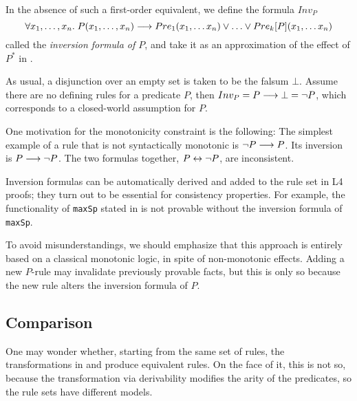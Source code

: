 In the absence of such a first-order equivalent, we define the formula $Inv_P$
\[
\forall x_1, \dots, x_n.\;  P(x_1, \dots, x_n) \IMPL Pre_1(x_1, \dots x_n) \OR \dots \OR Pre_k[P](x_1, \dots x_n)
\]
called the \emph{inversion formula of  $P$}, and take it as an approximation of the
effect of $P^*$ in .

As usual, a disjunction over an empty set is taken to be the falsum
$\bot$. Assume there are no defining rules for a predicate $P$, then $Inv_P =
P \longrightarrow \bot = \lnot P$, which corresponds to a closed-world assumption for $P$.

\begin{example}\label{ex:syntactically_non_monotonic_rule}
  One motivation for the monotonicity constraint is the following: The
  simplest example of a rule that is not syntactically monotonic is
  $\lnot P \longrightarrow P$. Its inversion is $P \longrightarrow \lnot P$. The two formulas
  together, $P \leftrightarrow \lnot P$, are inconsistent.
\end{example}

Inversion formulas can be automatically derived and added to the rule set in
L4 proofs; they turn out to be essential for consistency properties. For
example, the functionality of \texttt{maxSp} stated in 
is not provable without the inversion formula of \texttt{maxSp}.

To avoid misunderstandings, we should emphasize that this approach is entirely
based on a classical monotonic logic, in spite of non-monotonic
effects. Adding a new $P$-rule may invalidate previously provable facts, but
this is only so because the new rule alters the inversion formula of $P$.



\subsection{Comparison}\label{sec:comparison}

One may wonder whether, starting from the same set of rules, the transformations in
 and  produce
equivalent rules. On the face of it, this is not so, because the
transformation via derivability modifies the arity of the predicates, so the
rule sets have different models.

